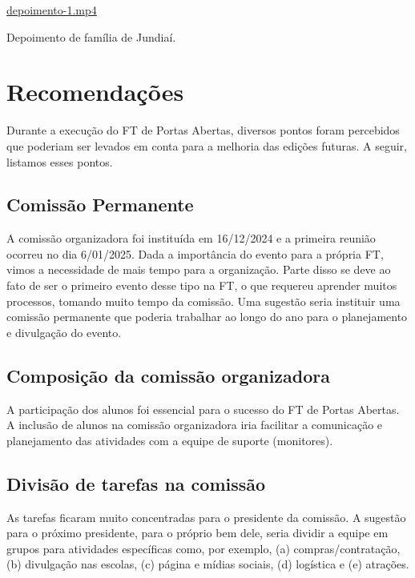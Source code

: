 \documentclass[
  letterpaper,
  DIV=11,
  numbers=noendperiod]{scrreprt}
\begin{document}
\url{depoimento-1.mp4}

Depoimento de família de Jundiaí.


\chapter{Recomendações}\label{recomendauxe7uxf5es}

Durante a execução do FT de Portas Abertas, diversos pontos foram
percebidos que poderiam ser levados em conta para a melhoria das edições
futuras. A seguir, listamos esses pontos.

\section{Comissão Permanente}\label{comissuxe3o-permanente}

A comissão organizadora foi instituída em 16/12/2024 e a primeira
reunião ocorreu no dia 6/01/2025. Dada a importância do evento para a
própria FT, vimos a necessidade de mais tempo para a organização. Parte
disso se deve ao fato de ser o primeiro evento desse tipo na FT, o que
requereu aprender muitos processos, tomando muito tempo da comissão. Uma
sugestão seria instituir uma comissão permanente que poderia trabalhar
ao longo do ano para o planejamento e divulgação do evento.

\section{Composição da comissão
organizadora}\label{composiuxe7uxe3o-da-comissuxe3o-organizadora}

A participação dos alunos foi essencial para o sucesso do FT de Portas
Abertas. A inclusão de alunos na comissão organizadora iria facilitar a
comunicação e planejamento das atividades com a equipe de suporte
(monitores).

\section{Divisão de tarefas na
comissão}\label{divisuxe3o-de-tarefas-na-comissuxe3o}

As tarefas ficaram muito concentradas para o presidente da comissão. A
sugestão para o próximo presidente, para o próprio bem dele, seria
dividir a equipe em grupos para atividades específicas como, por
exemplo, (a) compras/contratação, (b) divulgação nas escolas, (c) página
e mídias sociais, (d) logística e (e) atrações.
\end{document}

